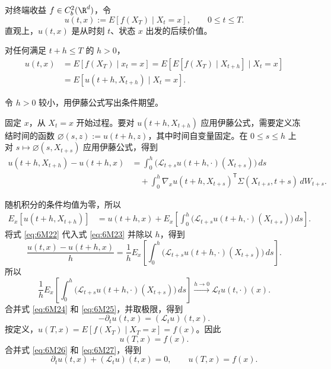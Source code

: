 对终端收益 $f\in C_b^2(\R^d)$，令
\[
  u(t,x):=E[f(X_T)\mid X_t=x],\qquad 0\leq t\leq T.
\]
直观上，$u(t,x)$ 是从时刻 $t$、状态 $x$ 出发的后续价值。


对任何满足 $t+h\leq T$ 的 $h>0$，
\begin{equation*}
  \begin{aligned}
  u(t,x)
    &=E[f(X_T)\mid x_t=x]
      =E[E[f(X_T)\mid X_{t+h}]\mid X_t=x]\\
    &=E[u(t+h,X_{t+h})\mid X_t=x].
  \end{aligned}
  \tag{6M22}\label{eq:6M22}
\end{equation*}


令 $h>0$ 较小，用伊藤公式写出条件期望。


固定 $x$，从 $X_t=x$ 开始过程。要对 $u(t+h,X_{t+h})$ 应用伊藤公式，需要定义冻结时间的函数 $\varnothing(s,z):=u(t+h,z)$，其中时间自变量固定。在 $0\leq s\leq h$ 上对 $s\mapsto\varnothing(s,X_{t+s})$ 应用伊藤公式，得到
\[
  \begin{aligned}
  u(t+h,X_{t+h})-u(t+h,x)
    &=\int_0^h\bigl(\mathcal L_{t+s}u(t+h,\cdot)(X_{t+s})\bigr)\,ds\\
    &\quad+\int_0^h \nabla_x u(t+h,X_{t+s})^{\mathsf T}
                 \Sigma(X_{t+s},t+s)\,dW_{t+s}.
  \end{aligned}
\]


随机积分的条件均值为零，所以
\begin{equation*}
  \begin{aligned}
  E_x[u(t+h,X_{t+h})]
    &=u(t+h,x)+E_x\left[\int_0^h
        \bigl(\mathcal L_{t+s}u(t+h,\cdot)(X_{t+s})\bigr)\,ds\right].
  \end{aligned}
  \tag{6M23}\label{eq:6M23}
\end{equation*}
将式 \eqref{eq:6M22} 代入式 \eqref{eq:6M23} 并除以 $h$，得到
\begin{equation*}
  \frac{u(t,x)-u(t+h,x)}{h}
    =\frac1h E_x\left[\int_0^h
       \bigl(\mathcal L_{t+s}u(t+h,\cdot)(X_{t+s})\bigr)\,ds\right].
  \tag{6M24}\label{eq:6M24}
\end{equation*}
所以
\begin{equation*}
  \frac1h E_x\left[\int_0^h
       \bigl(\mathcal L_{t+s}u(t+h,\cdot)(X_{t+s})\bigr)\,ds\right]
    \xrightarrow{h\to0}\mathcal L_tu(t,\cdot)(x).
  \tag{6M25}\label{eq:6M25}
\end{equation*}
合并式 \eqref{eq:6M24} 和 \eqref{eq:6M25}，并取极限，得到
\begin{equation*}
  -\partial_tu(t,x)=(\mathcal L_tu)(t,x).
  \tag{6M26}\label{eq:6M26}
\end{equation*}
按定义，$u(T,x)=E[f(X_T)\mid X_T=x]=f(x)$。因此
\begin{equation*}
  u(T,x)=f(x).
  \tag{6M27}\label{eq:6M27}
\end{equation*}
合并式 \eqref{eq:6M26} 和 \eqref{eq:6M27}，得到
\[
  \partial_tu(t,x)+(\mathcal L_tu)(t,x)=0,\qquad u(T,x)=f(x).
\]

